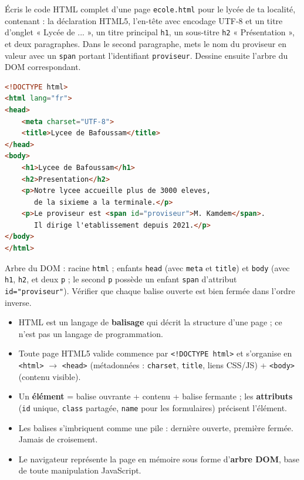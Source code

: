 \documentclass[11pt]{article}
\begin{document}
\begin{exercice}
Écris le code HTML complet d'une page \texttt{ecole.html} pour le lycée de ta localité, contenant : la déclaration HTML5, l'en-tête avec encodage UTF-8 et un titre d'onglet « Lycée de ... », un titre principal \texttt{h1}, un sous-titre \texttt{h2} « Présentation », et deux paragraphes. Dans le second paragraphe, mets le nom du proviseur en valeur avec un \texttt{span} portant l'identifiant \texttt{proviseur}. Dessine ensuite l'arbre du DOM correspondant.
\end{exercice}

\begin{corrige}[Exercice 1]
\begin{lstlisting}[language=HTML]
<!DOCTYPE html>
<html lang="fr">
<head>
    <meta charset="UTF-8">
    <title>Lycee de Bafoussam</title>
</head>
<body>
    <h1>Lycee de Bafoussam</h1>
    <h2>Presentation</h2>
    <p>Notre lycee accueille plus de 3000 eleves,
       de la sixieme a la terminale.</p>
    <p>Le proviseur est <span id="proviseur">M. Kamdem</span>.
       Il dirige l'etablissement depuis 2021.</p>
</body>
</html>
\end{lstlisting}
Arbre du DOM : racine \texttt{html} ; enfants \texttt{head} (avec \texttt{meta} et \texttt{title}) et \texttt{body} (avec \texttt{h1}, \texttt{h2}, et deux \texttt{p} ; le second \texttt{p} possède un enfant \texttt{span} d'attribut \texttt{id="proviseur"}). Vérifier que chaque balise ouverte est bien fermée dans l'ordre inverse.
\end{corrige}

\begin{aretenir}
\begin{itemize}
  \item HTML est un langage de \textbf{balisage} qui décrit la structure d'une page ; ce n'est pas un langage de programmation.
  \item Toute page HTML5 valide commence par \texttt{<!DOCTYPE html>} et s'organise en \texttt{<html>} $\rightarrow$ \texttt{<head>} (métadonnées : \texttt{charset}, \texttt{title}, liens CSS/JS) + \texttt{<body>} (contenu visible).
  \item Un \textbf{élément} = balise ouvrante + contenu + balise fermante ; les \textbf{attributs} (\texttt{id} unique, \texttt{class} partagée, \texttt{name} pour les formulaires) précisent l'élément.
  \item Les balises s'imbriquent comme une pile : dernière ouverte, première fermée. Jamais de croisement.
  \item Le navigateur représente la page en mémoire sous forme d'\textbf{arbre DOM}, base de toute manipulation JavaScript.
\end{itemize}
\end{aretenir}
\end{document}
